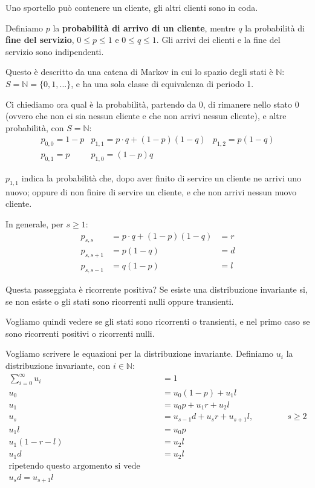 \documentclass[a4paper,12pt]{book}
\begin{document}
Uno sportello può contenere un cliente, gli altri clienti sono in coda. 

Definiamo $ p $ la \textbf{probabilità di arrivo di un cliente}, mentre $ q $ la probabilità di \textbf{fine del servizio}, $ 0 \le p \le 1 $ e $ 0 \le q \le 1 $. Gli arrivi dei clienti e la fine del servizio sono indipendenti. 

Questo è descritto da una catena di Markov in cui lo spazio degli stati è $ \mathbb{N} $: $ S = \mathbb{N} = \{0, 1, ...\} $, e ha una sola classe di equivalenza di periodo 1.

Ci chiediamo ora qual è la probabilità, partendo da 0, di rimanere nello stato 0 (ovvero che non ci sia nessun cliente e che non arrivi nessun cliente), e altre probabilità, con $ S = \mathbb{N} $:
$$ \begin{array}{ccc}
  p_{0,0} = 1-p & p_{1,1} = p\cdot q + (1-p)(1-q)  & p_{1,2} = p(1-q) \\
  p_{0,1} = p & p_{1,0} = (1-p)q & 
\end{array} $$

$ p_{1,1} $ indica la probabilità che, dopo aver finito di servire un cliente ne arrivi uno nuovo; oppure di non finire di servire un cliente, e che non arrivi nessun nuovo cliente. 

In generale, per $ s \ge 1 $:
\begin{align*}
	p_{s,s} & = p\cdot q + (1-p) (1-q) & = r \\
	p_{s,s+1} & = p(1-q) & = d \\
	p_{s,s-1} & = q(1-p) & = l
\end{align*}

Questa passeggiata è ricorrente positiva? Se esiste una distribuzione invariante si, se non esiste o gli stati sono ricorrenti nulli oppure transienti. 


Vogliamo quindi vedere se gli stati sono ricorrenti o transienti, e nel primo caso se sono ricorrenti positivi o ricorrenti nulli. 

Vogliamo scrivere le equazioni per la distribuzione invariante. Definiamo $ u_i $ la distribuzione invariante, con $ i \in \mathbb{N} $:
\begin{align*}
	\sum_{i=0}^{\infty} u_i & = 1 \\
	u_0 & = u_0(1-p) + u_1 l \\
	u_1 & = u_0 p + u_1 r + u_2 l \\
	u_s & = u_{s-1}d + u_s r + u_{s+1} l, \qquad \qquad s \ge 2 \\
	u_1 l & = u_0 p \\
	u_1(1-r-l) & = u_2 l \\
	u_1 d & = u_2 l \\	
	\text{ripetendo questo argomento si vede che:} \\
	u_s d = u_{s+1} l
\end{align*}
\end{document}
